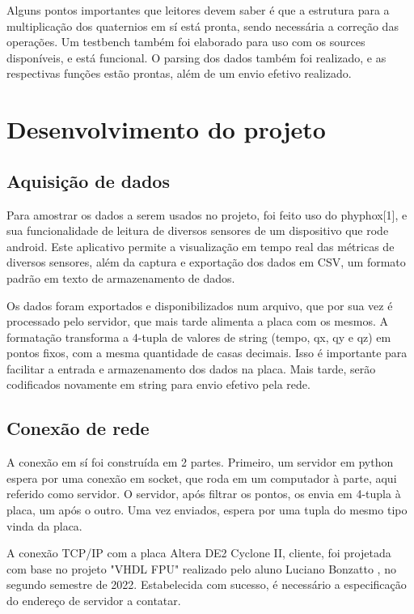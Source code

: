 \documentclass [12pt,oneside] {article}
\begin{document}
	Alguns pontos importantes que leitores devem saber é que a
estrutura para a multiplicação dos quaternios em sí está pronta,
sendo necessária a correção das operações. Um testbench também foi
elaborado para uso com os sources disponíveis, e está funcional. O
parsing dos dados também foi realizado, e as respectivas funções estão
prontas, além de um envio efetivo realizado.

\section{Desenvolvimento do projeto}

\subsection{Aquisição de dados}

	Para amostrar os dados a serem usados no projeto, foi feito
uso do phyphox[1], e sua funcionalidade de leitura de diversos
sensores de um dispositivo que rode android. Este aplicativo permite a
visualização em tempo real das métricas de diversos sensores, além da
captura e exportação dos dados em CSV, um formato padrão em texto de
armazenamento de dados.

	Os dados foram exportados e disponibilizados num arquivo, que
por sua vez é processado pelo servidor, que mais tarde alimenta a
placa com os mesmos. A formatação transforma a 4-tupla de valores de
string (tempo, qx, qy e qz) em pontos fixos, com a mesma
quantidade de casas decimais. Isso é importante para facilitar a
entrada e armazenamento dos dados na placa. Mais tarde, serão
codificados novamente em string para envio efetivo pela rede.

\subsection{Conexão de rede}

	A conexão em sí foi construída em 2 partes. Primeiro, um
servidor em python espera por uma conexão em socket, que roda em um
computador à parte, aqui referido como servidor. O servidor, após filtrar
os pontos, os envia em 4-tupla à placa, um após o outro. Uma vez
enviados, espera por uma tupla do mesmo tipo vinda da placa.

	A conexão TCP/IP com a placa Altera DE2 Cyclone II, cliente,
foi projetada com base no projeto "VHDL FPU" realizado pelo aluno
Luciano Bonzatto , no segundo semestre de 2022. Estabelecida com
sucesso, é necessário a especificação do endereço de servidor a
contatar.
\end{document}
